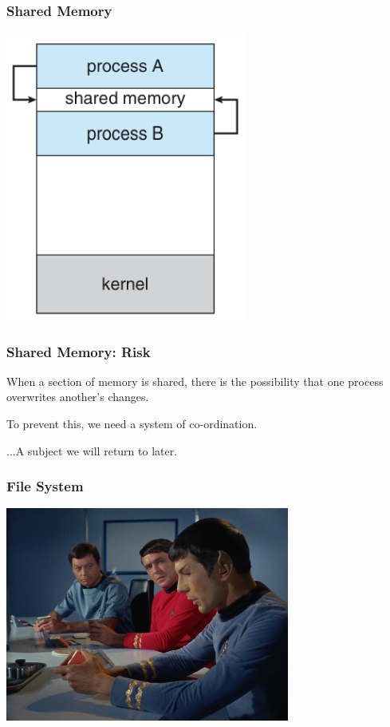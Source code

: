 \begin{frame}
\frametitle{Shared Memory}

\begin{center}
	\includegraphics[width=0.6\textwidth]{images/shared-memory.png}
\end{center}

\end{frame}

\begin{frame}
\frametitle{Shared Memory: Risk}

When a section of memory is shared, there is the possibility that one process overwrites another's changes.

To prevent this, we need a system of co-ordination.

...A subject we will return to later.

\end{frame}


\begin{frame}
\frametitle{File System}

\begin{center}
	\includegraphics[width=0.7\textwidth]{images/datatape.jpg}
\end{center}

\end{frame}


